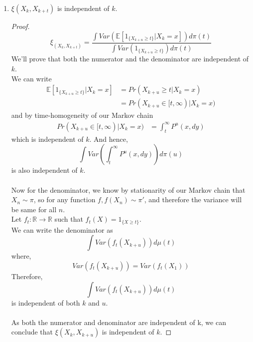 \begin{theorem}
\begin{enumerate}
        \item $\xi(X_k, X_{k+t})$ is independent of $k$.
        \begin{proof}
            \begin{equation}
                \xi_{(X_k, X_{k+t})} = \frac{\int Var(\mathbb{E}[1_{\{X_{k+u} \geq t\}}|X_k=x]) d\pi(t)}{\int Var(1_{\{X_{k+u} \geq t\}}) d\pi(t)}
            \end{equation}
            We'll prove that both the numerator and the denominator are independent of $k$. \\
            We can write 
            \begin{align}
                \mathbb{E}[1_{\{X_{k+u} \geq t\}}|X_k=x] &= Pr(X_{k+u} \geq t|X_k=x) \\
                &= Pr(X_{k+u} \in [t, \infty) | X_k = x)
            \end{align}
            and by time-homogeneity of our Markov chain
            \begin{align}
                Pr(X_{k+u} \in [t, \infty) | X_k = x) &= \int_t^{\infty} P^u(x, dy)
            \end{align}
            which is independent of $k$. And hence,
            \begin{equation}
                \int Var\left(\int_t^{\infty} P^u(x, dy)\right) d\pi(u) 
            \end{equation}
            is also independent of $k$.\\\\
            Now for the denominator, we know by stationarity of our Markov chain that $X_n \sim \pi$, so for any function $f, f(X_n) \sim \pi'$, and therefore the variance will be same for all $n$.\\ 
            Let $f_t: \mathbb{R} \rightarrow \mathbb{R}$ such that $f_t(X) = 1_{\{X \geq t\}}$.\\
            We can write the denominator as 
            $$\int Var(f_t(X_{k+u})) d\mu(t)$$
            where,
            $$Var(f_t(X_{k+u})) = Var(f_t(X_{1}))$$
            Therefore, 
            $$\int Var(f_t(X_{k+u})) d\mu(t)$$
            is independent of both $k$ and $u$.\\\\
            As both the numerator and denominator are independent of k, we can conclude that $\xi(X_k, X_{k+u})$ is independent of $k$.
        \end{proof}
        

\end{enumerate}
\end{theorem}
